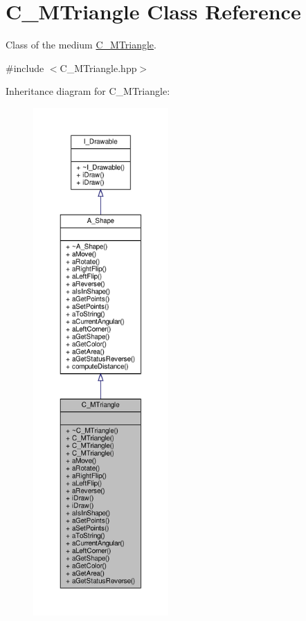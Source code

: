 \hypertarget{classC__MTriangle}{}\section{C\+\_\+\+M\+Triangle Class Reference}
\label{classC__MTriangle}


Class of the medium \hyperlink{classC__MTriangle}{C\+\_\+\+M\+Triangle}.  




{\ttfamily \#include $<$C\+\_\+\+M\+Triangle.\+hpp$>$}



Inheritance diagram for C\+\_\+\+M\+Triangle\+:\nopagebreak
\begin{figure}[H]
\begin{center}
\leavevmode
\includegraphics[height=550pt]{classC__MTriangle__inherit__graph}
\end{center}
\end{figure}


